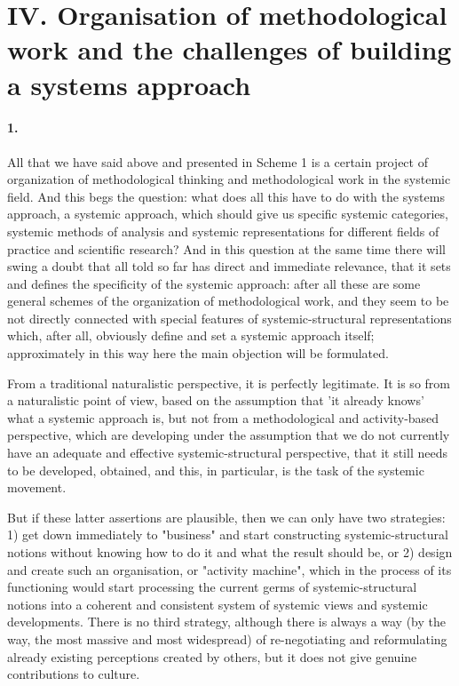 \documentclass[11pt,a4paper]{article}
\begin{document}
\section*{IV. Organisation of methodological work and the challenges of
  building a systems approach}

\paragraph{1.}
All that we have said above and presented in Scheme 1 is a certain project of
organization of methodological thinking and methodological work in the
systemic field. And this begs the question: what does all this have to do with
the systems approach, a systemic approach, which should give us specific
systemic categories, systemic methods of analysis and systemic representations
for different fields of practice and scientific research? And in this
question at the same time there will swing a doubt that all told so far has
direct and immediate relevance, that it sets and defines the specificity of
the systemic approach: after all these are some general schemes of the
organization of methodological work, and they seem to be not directly
connected with special features of systemic-structural representations which,
after all, obviously define and set a systemic approach itself; approximately
in this way here the main objection will be formulated.

From a traditional naturalistic perspective, it is perfectly legitimate. It is
so from a naturalistic point of view, based on the assumption that 'it already
knows' what a systemic approach is, but not from a methodological and
activity-based perspective, which are developing under the assumption that we
do not currently have an adequate and effective systemic-structural
perspective, that it still needs to be developed, obtained, and this, in
particular, is the task of the systemic movement.

But if these latter assertions are plausible, then we can only have two
strategies: 1) get down immediately to "business" and start constructing
systemic-structural notions without knowing how to do it and what the result
should be, or 2) design and create such an organisation, or "activity
machine", which in the process of its functioning would start processing the
current germs of systemic-structural notions into a coherent and consistent
system of systemic views and systemic developments. There is no third
strategy, although there is always a way (by the way, the most massive and
most widespread) of re-negotiating and reformulating already existing
perceptions created by others, but it does not give genuine contributions to
culture.
\end{document}
